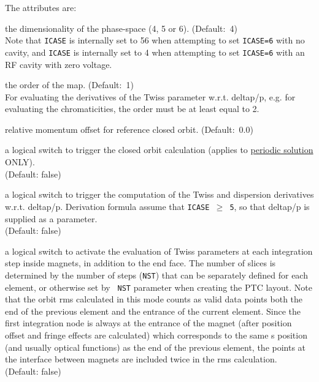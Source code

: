 The attributes are: 
\begin{madlist}

  the dimensionality of the phase-space (4, 5 or
  6). (Default:~4)\\ Note that {\tt ICASE} is internally set to 56 when
  attempting to set {\tt ICASE=6} with no cavity, and {\tt ICASE} is
  internally set to 4 when attempting to set {\tt ICASE=6} with an RF
  cavity with zero voltage.

  the order of the map. (Default:~1)\\ For evaluating the
  derivatives of the Twiss parameter w.r.t. deltap/p, e.g. for
  evaluating the chromaticities, the order must be at least equal to 2.

  relative momentum offset for reference closed orbit. (Default:~0.0) 

  a logical switch to trigger the closed orbit calculation
  (applies to \hyperref[sec:ptc-twiss-periodic]{periodic solution} ONLY). \\  
  (Default: false)

  a logical switch to trigger the computation of the Twiss and
  dispersion derivatives w.r.t. deltap/p. Derivation formula assume that
  {\tt ICASE $\ge$ 5}, so that deltap/p is supplied as a parameter. \\
  (Default: false)

  a logical switch to activate the evaluation of Twiss parameters at each
  integration step inside magnets, in addition to the end face.  The
  number of slices is determined by the number of steps ({\tt NST}) that
  can be separately defined for each element, or otherwise set by {\tt
    NST} parameter when creating the PTC layout.  Note that the orbit
  rms calculated in this mode counts as valid data points both the end
  of the previous element and the entrance of the current element. Since
  the first integration node is always at the entrance of the magnet
  (after position offset and fringe effects are calculated) which
  corresponds to the same s position (and usually optical functions) as
  the end of the previous element, the points at the interface between
  magnets are included twice in the rms calculation. \\ 
  (Default: false)


\end{madlist}
